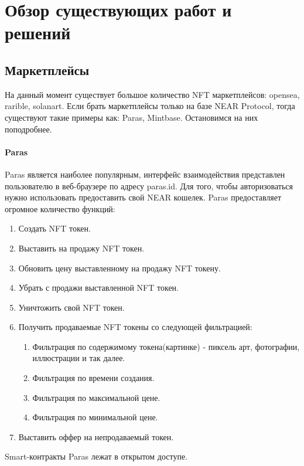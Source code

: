 \section{Обзор существующих работ и решений}
\label{section.theory}
\subsection{Маркетплейсы}
На данный момент существует большое количество NFT маркетплейсов: opensea\cite{opensea}, rarible\cite{rarible}, solanart\cite{solanart}. Если брать маркетплейсы только на базе NEAR Protocol, тогда существуют такие примеры как: Paras\cite{paras}, Mintbase\cite{mintbase}. Остановимся на них поподробнее.

\paragraph{Paras}

Paras является наиболее популярным, интерфейс взаимодействия представлен пользователю в веб-браузере по адресу paras.id. Для того, чтобы авторизоваться нужно использовать
предоставить свой NEAR кошелек. Paras предоставляет огромное количество функций:
\begin{enumerate}
    \item Создать NFT токен.
    \item Выставить на продажу NFT токен.
    \item Обновить цену выставленному на продажу NFT токену.
    \item Убрать с продажи выставленной NFT токен.
    \item Уничтожить свой NFT токен.
    \item Получить продаваемые NFT токены со следующей фильтрацией:
        \begin{enumerate}
            \item Фильтрация по содержимому токена(картинке) - пиксель арт, фотографии, иллюстрации и так далее.
            \item Фильтрация по времени создания.
            \item Фильтрация по максимальной цене.
            \item Фильтрация по минимальной цене.
        \end{enumerate}
    \item Выставить оффер на непродаваемый токен.
\end{enumerate}

Smart-контракты Paras лежат в открытом доступе\cite{parasnftcontract, parasmarketplacecontract}.

